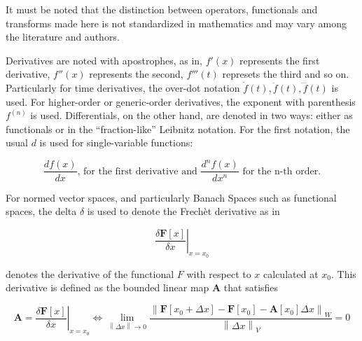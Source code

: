 	It must be noted that the distinction between operators, functionals and transforms made here is not standardized in mathematics and may vary among the literature and authors.

	Derivatives are noted with apostrophes, as in, $f'(x)$ represents the first derivative, $f''(x)$ represents the second, $f'''(t)$ represets the third and so on. Particularly for time derivatives, the over-dot notation $\dot{f}(t), \ddot{f}(t), \dddot{f}(t)$ is used. For higher-order or generic-order derivatives, the exponent with parenthesis $f^{(n)}$ is used. Differentials, on the other hand, are denoted in two ways: either as functionals or in the ``fraction-like'' Leibnitz notation. For the first notation, the usual $d$ is used for single-variable functions:

\begin{equation} \dfrac{df(x)}{dx} \text{, for the first derivative and } \dfrac{d^nf(x)}{dx^n} \text{ for the n-th order} .\end{equation}

%

	For normed vector spaces, and particularly Banach Spaces such as functional spaces, the delta $\delta$ is used to denote the Frechèt derivative as in

\begin{equation} \left.\dfrac{\delta \mathbf{F}\left[x\right]}{\delta x}\right\rvert_{x=x_0} \end{equation}

	\noindent denotes the derivative of the functional $F$ with respect to $x$ calculated at $x_0$. This derivative is defined as the bounded linear map $\mathbf{A}$ that satisfies

\begin{equation} \mathbf{A} = \left.\dfrac{\delta \mathbf{F}\left[x\right]}{\delta x}\right\rvert_{x=x_0} \Leftrightarrow \lim\limits_{\left\lVert \Delta x\right\rVert\to 0} \dfrac{\left\lVert \mathbf{F}\left[x_0 + \Delta x\right] - \mathbf{F}\left[x_0\right] - \mathbf{A}\left[x_0\right] \Delta x \right\rVert_W}{\left\lVert \Delta x\right\rVert_V} = 0 \label{eq:def_frechet}\end{equation}

